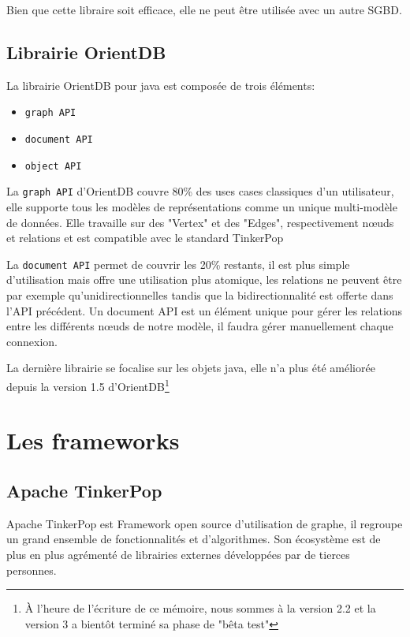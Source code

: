 \documentclass[a4paper,fleqn,12pt]{report}
\begin{document}
Bien que cette libraire soit efficace, elle ne peut être utilisée avec un autre SGBD. 

\subsection{Librairie OrientDB}

La librairie OrientDB pour java est composée de trois éléments:

\begin{itemize}
\item \texttt{graph API}
\item \texttt{document API}
\item \texttt{object API}
\end{itemize}

La \texttt{graph API} d’OrientDB couvre 80\% des uses cases classiques d’un utilisateur, elle supporte tous les modèles de représentations comme un unique multi-modèle de données. Elle travaille sur des "Vertex" et des "Edges", respectivement nœuds et relations et est compatible avec le standard TinkerPop

La \texttt{document API} permet de couvrir les 20\% restants, il est plus simple d’utilisation mais offre une utilisation plus atomique, les relations ne peuvent être par exemple qu’unidirectionnelles tandis que la bidirectionnalité est offerte dans l’API précédent. Un document API est un élément unique pour gérer les relations entre les différents nœuds de notre modèle, il faudra gérer manuellement chaque connexion.

La dernière librairie se focalise sur les objets java, elle n'a plus été améliorée depuis la version 1.5 d'OrientDB\footnote{À l'heure de l'écriture de ce mémoire, nous sommes à la version 2.2 et la version 3 a bientôt terminé sa phase de "bêta test"}

\section{Les frameworks}

\subsection{Apache TinkerPop}

Apache TinkerPop est Framework open source d’utilisation de graphe, il regroupe un grand ensemble de fonctionnalités et d’algorithmes. Son écosystème est de plus en plus agrémenté de librairies externes développées par de tierces personnes.
\end{document}
